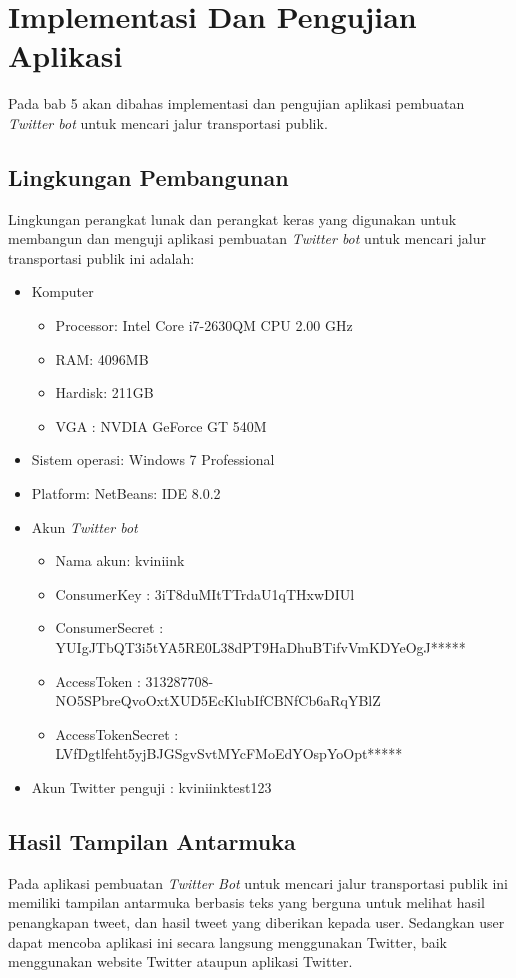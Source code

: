 \chapter{Implementasi Dan Pengujian Aplikasi}
\label{chap:implementasi dan pengujian aplikasi}

Pada bab 5 akan dibahas implementasi dan pengujian aplikasi pembuatan \textit{Twitter bot} untuk mencari jalur transportasi publik.

\section{Lingkungan Pembangunan}
Lingkungan perangkat lunak dan perangkat keras yang digunakan untuk membangun dan menguji aplikasi pembuatan \textit{Twitter bot} untuk mencari jalur transportasi publik ini adalah:
\begin{itemize}
	\item Komputer
	
	
	\begin{itemize}
		\item Processor: Intel Core i7-2630QM CPU 2.00 GHz
		\item RAM: 4096MB
		\item Hardisk: 211GB
		\item VGA : NVDIA GeForce GT 540M
	\end{itemize}
	\item Sistem operasi: Windows 7 Professional
	\item Platform: NetBeans: IDE 8.0.2
	
	\item Akun \textit{Twitter bot}
	\begin{itemize}
		\item Nama akun: kviniink
		\item ConsumerKey : 3iT8duMItTTrdaU1qTHxwDIUl
		\item ConsumerSecret : YUIgJTbQT3i5tYA5RE0L38dPT9HaDhuBTifvVmKDYeOgJ*****
		\item AccessToken : 313287708-NO5SPbreQvoOxtXUD5EcKlubIfCBNfCb6aRqYBlZ
		\item AccessTokenSecret : LVfDgtlfeht5yjBJGSgvSvtMYcFMoEdYOspYoOpt*****
	\end{itemize}
	
	\item Akun Twitter penguji : kviniinktest123
\end{itemize}

\iffalse
\section{Hasil Tampilan Antarmuka}
Pada aplikasi pembuatan \textit{Twitter Bot} untuk mencari jalur transportasi publik ini memiliki tampilan antarmuka berbasis teks yang berguna untuk melihat hasil penangkapan tweet, dan hasil tweet yang diberikan kepada user. Sedangkan user dapat mencoba aplikasi ini secara langsung menggunakan Twitter, baik menggunakan website Twitter ataupun aplikasi Twitter. 

